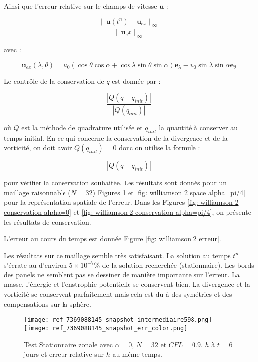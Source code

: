 Ainsi que l'erreur relative sur le champs de vitesse $\mathbf{u}$ : 

\begin{equation}
\dfrac{\| \mathbf{u}(t^n) - \mathbf{u}_{ex}\|_{\infty}}{\| \mathbf{u}_ex \|_\infty}
\end{equation}

avec :

\begin{equation}
\mathbf{u}_{ex}(\lambda, \theta) = u_0 \left( \cos \theta \cos \alpha + \cos \lambda \sin \theta \sin \alpha \right) \mathbf{e}_{\lambda} - u_0 \sin \lambda \sin \alpha \mathbf{e}_{\theta}
\end{equation}

Le contrôle de la conservation de $q$ est donnée par :

\begin{equation}
\dfrac{|Q(q - q_{init})|}{|Q(q_{init})|}
\end{equation}

où $Q$ est la méthode de quadrature utilisée et $q_{init}$ la quantité à conserver au temps initial. En ce qui concerne la conservation de la divergence et de la vorticité, on doit avoir $Q(q_{init})=0$ donc on utilise la formule :

\begin{equation}
|Q(q - q_{init})|
\end{equation}

pour vérifier la conservation souhaitée. Les résultats sont donnés pour un maillage raisonnable ($N=32$)  Figures \ref{fig: williamson 2 space alpha=0} et \ref{fig: williamson 2 space alpha=pi/4} pour la représentation spatiale de l'erreur. Dans les Figures \ref{fig: williamson 2 conservation alpha=0} et \ref{fig: williamson 2 conservation alpha=pi/4}, on présente les résultats de conservation.

L'erreur au cours du temps est donnée Figure \ref{fig: williamson 2 erreur}.

Les résultats sur ce maillage semble très satisfaisant. La solution au temps $t^n$ s'écrate au d'environ $5 \times 10^{-7} \%$ de la solution recherchée (stationnaire).
Les bords des panels ne semblent pas se dessiner de manière importante sur l'erreur. 
La masse, l'énergie et l'enstrophie potentielle se conservent bien. La divergence et la vorticité se conservent parfaitement mais cela est du à des symétries et des compensations sur la sphère.

\begin{figure}[ht]
\begin{center}
\texttt{[image: ref\_7369088145\_snapshot\_intermediaire598.png]}\\
\texttt{[image: ref\_7369088145\_snapshot\_err\_color.png]}
\end{center}
\caption{Test Stationnaire zonale \cite{Williamson1992} avec $\alpha=0$, $N=32$ et $CFL=0.9$. $h$ à $t=6$ jours et erreur relative sur $h$ au même temps.}
\label{fig: williamson 2 space alpha=0}
\end{figure}

